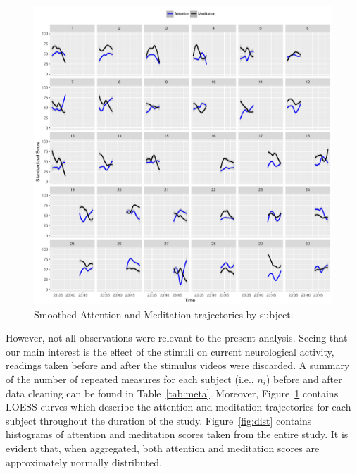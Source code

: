 \documentclass{article}[12pt]
\begin{document}
\begin{figure}
	\centering
	\includegraphics[width=\linewidth]{figures/traj.pdf}
	\caption{Smoothed Attention and Meditation trajectories by subject.}
	\label{fig:traj}
\end{figure}

However, not all observations were relevant to the present analysis. Seeing that our main interest is the effect of the stimuli on current neurological activity, readings taken before and after the stimulus videos were discarded. 
A summary of the number of repeated measures for each subject (i.e., $n_i$) before and after data cleaning can be found in Table~\ref{tab:meta}. Moreover, Figure~\ref{fig:traj} contains LOESS curves which describe the attention and meditation trajectories for each subject throughout the duration of the study.  Figure~\ref{fig:dist} contains histograms of attention and meditation scores taken from the entire study. It is evident that, when aggregated, both attention and meditation scores are approximately normally distributed.


\end{document}
